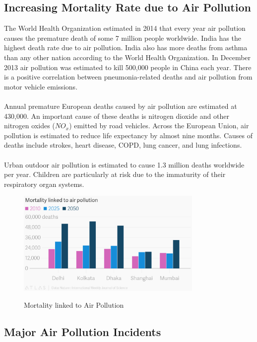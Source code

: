 \subsection{Increasing Mortality Rate due to Air Pollution}
 The World Health Organization estimated in 2014 that every year air pollution causes the premature death of some 7 million people worldwide. India has the highest death rate due to air pollution. India also has more deaths from asthma than any other nation according to the World Health Organization. In December 2013 air pollution was estimated to kill 500,000 people in China each year. There is a positive correlation between pneumonia-related deaths and air pollution from motor vehicle emissions.
\\
\\
Annual premature European deaths caused by air pollution are estimated at 430,000. An important cause of these deaths is nitrogen dioxide and other nitrogen oxides ($NO_x$) emitted by road vehicles. Across the European Union, air pollution is estimated to reduce life expectancy by almost nine months. Causes of deaths include strokes, heart disease, COPD, lung cancer, and lung infections.
\\
\\
Urban outdoor air pollution is estimated to cause 1.3 million deaths worldwide per year. Children are particularly at risk due to the immaturity of their respiratory organ systems.\cite{7}
\begin{figure}[h]
\centering
\includegraphics[width=0.8\textwidth]{./deadly}\\[0.1in]
\caption{Mortality linked to Air Pollution \cite{8}}
\label{fig: Mortality Linked to Air Pollution}
\end{figure}


\subsection{Major Air Pollution Incidents}

